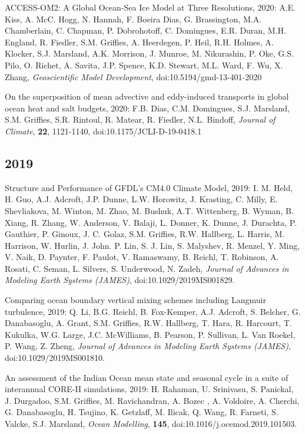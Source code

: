 \begin{etaremune}
\item ACCESS-OM2: A Global Ocean-Sea Ice Model at Three Resolutions, 2020: A.E. Kiss, A. McC. Hogg, N. Hannah, F. Boeira Dias, G. Brassington, M.A. Chamberlain, C. Chapman, P. Dobrohotoff, C. Domingues, E.R. Duran, M.H. England, R. Fiedler, S.M. Grif\/f\/ies,  A. Heerdegen, P. Heil, R.H. Holmes, A. Klocker, S.J. Marsland, A.K. Morrison, J. Munroe, M. Nikurashin, P. Oke, G.S. Pilo, O. Richet, A. Savita, J.P. Spence, K.D. Stewart, M.L. Ward, F. Wu, X. Zhang, {\it Geoscientific Model Development}, doi:10.5194/gmd-13-401-2020

\item On the superposition of mean advective and eddy-induced transports in global ocean heat and salt budgets, 2020: F.B. Dias, C.M. Domingues, S.J. Marsland, S.M. Grif\/f\/ies, S.R. Rintoul, R. Matear, R. Fiedler, N.L. Bindoff, {\it Journal of Climate}, {\bf 22}, 1121-1140, doi:10.1175/JCLI-D-19-0418.1

\subsection*{\sc \color{Maroon} 2019}

\item Structure and Performance of GFDL's CM4.0 Climate Model, 2019: I. M. Held, H. Guo, A.J. Adcroft, J.P. Dunne, L.W. Horowitz, J. Krasting, C. Milly, E. Shevliakova, M. Winton, M. Zhao, M. Bushuk, A.T. Wittenberg, B. Wyman, B. Xiang, R. Zhang, W. Anderson, V. Balaji, L. Donner, K. Dunne, J. Durachta, P. Gauthier, P. Ginoux, J. C. Golaz, S.M. Griffies, R.W. Hallberg, L.  Harris, M. Harrison, W. Hurlin, J. John. P. Lin, S. J. Lin, S. Malyshev, R. Menzel, Y. Ming, V. Naik, D. Paynter, F. Paulot, V. Ramaswamy, B. Reichl, T. Robinson, A. Rosati, C. Seman, L. Silvers, S. Underwood, N. Zadeh, {\it Journal of Advances in Modeling Earth Systems (JAMES)}, doi:10.1029/2019MS001829.

\item Comparing ocean boundary vertical mixing schemes including Langmuir turbulence, 2019: Q. Li, B.G. Reichl,  B. Fox-Kemper, A.J. Adcroft, S. Belcher, G. Danabasoglu, A. Grant, S.M. Grif\/f\/ies, R.W. Hallberg, T. Hara, R. Harcourt, T. Kukulka, W.G. Large, J.C. McWilliams, B. Pearson, P. Sullivan, L. Van Roekel, P. Wang, Z. Zheng, {\it Journal of Advances in Modeling Earth Systems (JAMES)}, doi:10.1029/2019MS001810.

\item An assessment of the Indian Ocean mean state and seasonal cycle in a suite of interannual CORE-II simulations, 2019: H. Rahaman, U. Srinivasu,  S. Panickal, J. Durgadoo, S.M. Grif\/f\/ies, M. Ravichandran, A. Bozec , A. Voldoire, A. Cherchi, G. Danabasoglu, H. Tsujino, K. Getzlaff, M. Ilicak, Q. Wang, R. Farneti, S. Valcke, S.J. Marsland, {\it Ocean Modelling}, {\bf 145},  
doi:10.1016/j.ocemod.2019.101503.



\end{etaremune}
